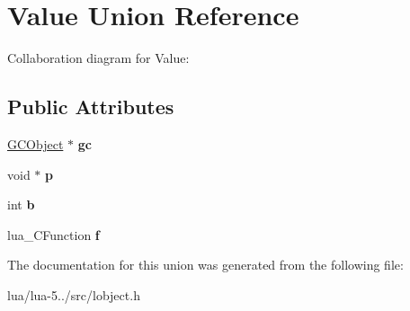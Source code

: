 \hypertarget{union_value}{\section{Value Union Reference}
\label{union_value}
}


Collaboration diagram for Value\+:
\subsection*{Public Attributes}
\begin{DoxyCompactItemize}
\item 
\hypertarget{union_value_afc72971d7fb256f8286b0a763be3e543}{\hyperlink{union_g_c_object}{G\+C\+Object} $\ast$ {\bfseries gc}}\label{union_value_afc72971d7fb256f8286b0a763be3e543}

\item 
\hypertarget{union_value_aa001f39a25c7d85a27cbdbab2d386ccd}{void $\ast$ {\bfseries p}}\label{union_value_aa001f39a25c7d85a27cbdbab2d386ccd}

\item 
\hypertarget{union_value_a121086ae65144dd506451da395cfa6b2}{int {\bfseries b}}\label{union_value_a121086ae65144dd506451da395cfa6b2}

\item 
\hypertarget{union_value_acc94eaa63b3acf650541fcd09025f2ad}{lua\+\_\+\+C\+Function {\bfseries f}}\label{union_value_acc94eaa63b3acf650541fcd09025f2ad}

\end{DoxyCompactItemize}


The documentation for this union was generated from the following file\+:\begin{DoxyCompactItemize}
\item 
lua/lua-\/5../src/lobject.\+h\end{DoxyCompactItemize}
